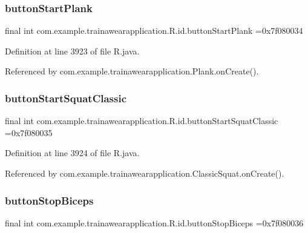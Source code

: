 \subsubsection{\texorpdfstring{buttonStartPlank}{buttonStartPlank}}
{\footnotesize\ttfamily final int com.\+example.\+trainawearapplication.\+R.\+id.\+button\+Start\+Plank =0x7f080034\hspace{0.3cm}{\ttfamily [static]}}



Definition at line 3923 of file R.\+java.



Referenced by com.\+example.\+trainawearapplication.\+Plank.\+on\+Create().

\mbox{\label{classcom_1_1example_1_1trainawearapplication_1_1_r_1_1id_a2188491e7e153f7fb3dbf4de4b60942f}} 
\subsubsection{\texorpdfstring{buttonStartSquatClassic}{buttonStartSquatClassic}}
{\footnotesize\ttfamily final int com.\+example.\+trainawearapplication.\+R.\+id.\+button\+Start\+Squat\+Classic =0x7f080035\hspace{0.3cm}{\ttfamily [static]}}



Definition at line 3924 of file R.\+java.



Referenced by com.\+example.\+trainawearapplication.\+Classic\+Squat.\+on\+Create().

\mbox{\label{classcom_1_1example_1_1trainawearapplication_1_1_r_1_1id_a03dff954dc448697ba07074b01d9997a}} 
\subsubsection{\texorpdfstring{buttonStopBiceps}{buttonStopBiceps}}
{\footnotesize\ttfamily final int com.\+example.\+trainawearapplication.\+R.\+id.\+button\+Stop\+Biceps =0x7f080036\hspace{0.3cm}{\ttfamily [static]}}



